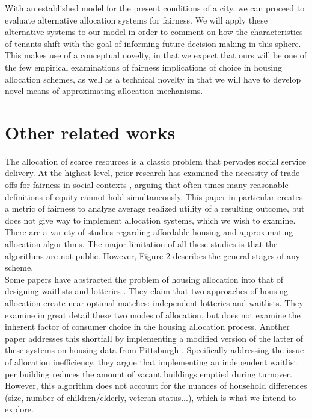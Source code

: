 \documentclass[11pt]{article}
\begin{document}
\newline
With an established model for the present conditions of a city, we can proceed to evaluate alternative allocation systems for fairness. We will apply these alternative systems to our model in order to comment on how the characteristics of tenants shift with the goal of informing future decision making in this sphere. This makes use of a conceptual novelty, in that we expect that ours will be one of the few empirical examinations of fairness implications of choice in housing allocation schemes, as well as a technical novelty in that we will have to develop novel means of approximating allocation mechanisms.
\section{Other related works}
The allocation of scarce resources is a classic problem that pervades social service delivery. At the highest level, prior research has examined the necessity of trade-offs for fairness in social contexts \cite{mashiat2022trade}, arguing that often times many reasonable definitions of equity cannot hold simultaneously. This paper in particular creates a metric of fairness to analyze average realized utility of a resulting outcome, but does not give way to implement allocation systems, which we wish to examine. \\
\newline
There are a variety of studies regarding affordable housing and approximating allocation algorithms. The major limitation of all these studies is that the algorithms are not public. However, Figure 2 describes the general stages of any scheme.\\
\newline
Some papers have abstracted the problem of housing allocation into that of designing waitlists and lotteries \cite{arnosti2020design}. They claim that two approaches of housing allocation create near-optimal matches: independent lotteries and waitlists. They examine in great detail these two modes of allocation, but does not examine the inherent factor of consumer choice in the housing allocation process. Another paper addresses this shortfall by implementing a modified version of the latter of these systems on housing data from Pittsburgh \cite{harvardpublichousing}. Specifically addressing the issue of allocation inefficiency, they argue that implementing an independent waitlist per building reduces the amount of vacant buildings emptied during turnover. However, this algorithm does not account for the nuances of household differences (size, number of children/elderly, veteran status...), which is what we intend to explore. \\
\end{document}
